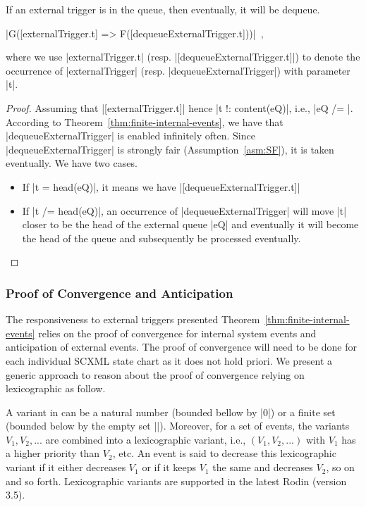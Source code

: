 \begin{theorem}
  \label{thm:resp-ext-trg}
  If an external trigger is in the queue, then eventually, it will be dequeue.
  \begin{center}
    |G([externalTrigger.t] => F([dequeueExternalTrigger.t]))|~,
  \end{center}
  where we use |externalTrigger.t|
  (resp. |[dequeueExternalTrigger.t]|) to denote the occurrence of
  |externalTrigger| (resp. |dequeueExternalTrigger|) with parameter |t|.
\end{theorem}
\begin{proof}
  Assuming that |[externalTrigger.t]| hence |t !: content(eQ)|, i.e.,
  |eQ /= {}|.  According to Theorem~\ref{thm:finite-internal-events},
  we have that |dequeueExternalTrigger| is enabled infinitely often.
  Since |dequeueExternalTrigger| is strongly fair
  (Assumption~\ref{asm:SF}), it is taken eventually. We have two
  cases.
  \begin{itemize}
  \item If |t = head(eQ)|, it means we have
    |[dequeueExternalTrigger.t]|
    
  \item If |t /= head(eQ)|, an occurrence of |dequeueExternalTrigger|
    will move |t| closer to be the head of the external queue |eQ| and
    eventually it will become the head of the queue and subsequently
    be processed eventually.
  \end{itemize}
\end{proof}

\subsubsection{Proof of Convergence and Anticipation}
\label{sec:proof-convergence}
The responsiveness to external triggers presented
Theorem~\ref{thm:finite-internal-events} relies on the proof of
convergence for internal system events and anticipation of external
events. The proof of convergence will need to be done for each
individual SCXML state chart as it does not hold priori.  We present a
generic approach to reason about the proof of convergence relying on
lexicographic as follow.

A variant in \EventB can be a natural number (bounded bellow by |0|)
or a finite set (bounded below by the empty set |{}|).  Moreover, for
a set of events, the variants $V_1, V_2, ...$ are combined into a
lexicographic variant, i.e., $(V_1, V_2, ...)$ with $V_1$ has a higher
priority than $V_2$, etc. An event is said to decrease this
lexicographic variant if it either decreases $V_1$ or if it keeps
$V_1$ the same and decreases $V_2$, so on and so forth.  Lexicographic
variants are supported in the latest Rodin (version 3.5).


